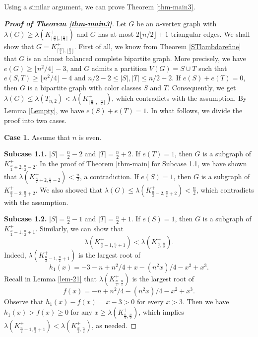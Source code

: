 \documentclass[11pt]{article}
\begin{document}
\label{sec6}

Using a similar argument, 
we can prove Theorem \ref{thm-main3}. 

\begin{proof}[{\bf Proof of Theorem \ref{thm-main3}}]
Let  $G$ be an $n$-vertex graph with 
$\lambda (G) \ge \lambda (K_{\lceil \frac{n}{2}\rceil , \lfloor \frac{n}{2}\rfloor}^+)$ and 
$G$ has at most $2 \lfloor n/2 \rfloor +1$ triangular edges.  
We shall show that $G=K_{\lceil \frac{n}{2}\rceil , \lfloor \frac{n}{2}\rfloor}^+$.  
First of all, 
we know from Theorem \ref{STlambdarefine} that
 $G$ is an almost balanced complete bipartite graph. 
 More precisely, we have $e(G)\ge \lfloor {n^2}/{4} \rfloor -3 $, and $G$ admits a partition $V(G)=S\cup T$ such that  
$e(S,T)\ge \lfloor n^2/4 \rfloor -4$ and 
$n/2 -2\le |S|,|T| \le n/2 +2$.   
 If $e(S) + e(T)=0$,  
then $G$ is a bipartite graph with color classes $S$ and $T$. 
Consequently, we get
 $\lambda (G)
\le \lambda (T_{n,2}) < \lambda (K_{\lceil \frac{n}{2}\rceil , \lfloor \frac{n}{2}\rfloor}^+)$, which contradicts with 
the assumption. 
By Lemma \ref{Lempty}, 
we  have $e(S) + e(T)=1$. 
In what follows, we divide the proof into two cases. 


\medskip 
{\bf Case 1.} Assume that $n$ is even. 

\medskip 
{\bf Subcase 1.1.}  $|S|= \frac{n}{2} -2$ and $|T|=\frac{n}{2} +2$. 
If $e(T)=1$, then $G$ is a subgraph of $K_{\frac{n}{2} +2, \frac{n}{2} -2}^+$. In the proof of 
Theorem \ref{thm-main} for Subcase 1.1,  
we have shown that 
$\lambda (K_{\frac{n}{2} +2, \frac{n}{2} -2}^+) < \frac{n}{2}$, a contradiction. 
 If $e(S)=1$, then $G$ is a subgraph of $K_{\frac{n}{2} -2, \frac{n}{2} +2}^+$.  We also showed that 
 $\lambda (G)\le  \lambda (K_{\frac{n}{2} -2, \frac{n}{2} +2}^+) < \frac{n}{2}$, which contradicts with the assumption. 

\medskip 
{\bf Subcase 1.2.}  $|S|= \frac{n}{2} -1$ and $|T|=\frac{n}{2} +1$.  
If $e(S)=1$, then $G$ is a subgraph of $K_{\frac{n}{2} -1, \frac{n}{2} +1}^+$. Similarly, we can show that 
\[ \lambda (K_{\frac{n}{2} -1, \frac{n}{2} +1}^+) < 
\lambda (K_{\frac{n}{2} , \frac{n}{2} }^+). \]  
Indeed, $\lambda (K_{\frac{n}{2} -1, \frac{n}{2} +1}^+)$ 
is the largest root of 
\[  h_1(x)= -3 - n + n^2/4 + x - (n^2 x)/4 - x^2 + x^3. \]
Recall in Lemma \ref{lem-21} that 
$\lambda (K_{\frac{n}{2} , \frac{n}{2} }^+)$ is the largest root of 
\[ f(x) =-n + n^2/4 - (n^2 x)/4 - x^2 + x^3.  \]
Observe that $h_1(x) - f(x) = x-3 >0$ for every $x>3$. 
Then we have $h_1(x) > f(x) \ge 0$ for any 
$x\ge \lambda (K_{\frac{n}{2} , \frac{n}{2} }^+)$, 
which implies $\lambda (K_{\frac{n}{2} -1, \frac{n}{2} +1}^+) < 
\lambda (K_{\frac{n}{2} , \frac{n}{2} }^+)$, as needed. 



\end{proof}
\end{document}
